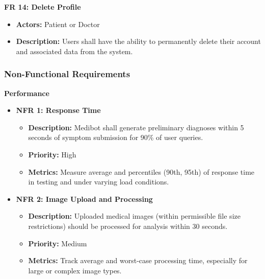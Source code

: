 \textbf{FR 14: Delete Profile} 
\begin{itemize}
    \item \textbf{Actors:} Patient or Doctor
    \item \textbf{Description:} Users shall have the ability to permanently delete their account and associated data from the system.
\end{itemize} 


\subsubsection{Non-Functional Requirements}

\textbf{Performance}


\begin{itemize}
    \item \textbf{NFR 1: Response Time}
        \begin{itemize}
            \item \textbf{Description:} Medibot shall generate preliminary diagnoses within 5 seconds of symptom submission for 90\% of user queries.
            \item \textbf{Priority:} High 
            \item \textbf{Metrics:} Measure average and percentiles (90th, 95th) of response time in testing and under varying load conditions.
        \end{itemize}

    \item \textbf{NFR 2: Image Upload and Processing} 
        \begin{itemize}
            \item \textbf{Description:}  Uploaded medical images (within permissible file size restrictions) should be processed for analysis within 30 seconds.
            \item \textbf{Priority:} Medium
            \item \textbf{Metrics:}  Track average and worst-case processing time, especially for large or complex image types. 
        \end{itemize}
\end{itemize}




